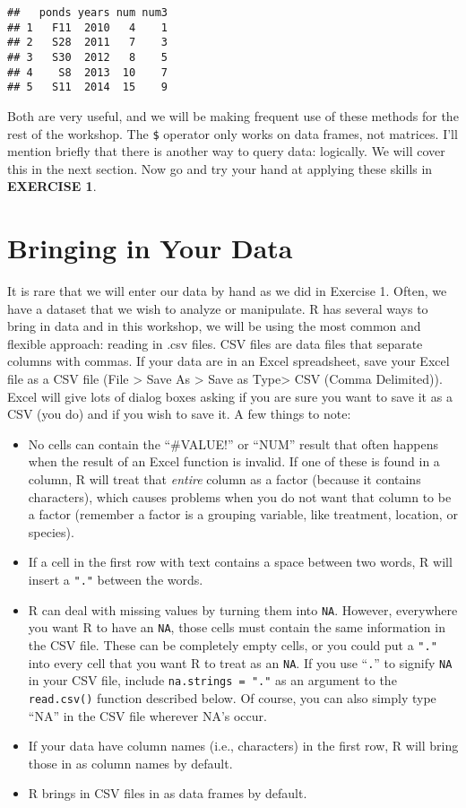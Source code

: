 \documentclass[]{book}
\theoremstyle{definition}
\theoremstyle{definition}
\theoremstyle{definition}
\theoremstyle{remark}
\begin{document}
\begin{verbatim}
##   ponds years num num3
## 1   F11  2010   4    1
## 2   S28  2011   7    3
## 3   S30  2012   8    5
## 4    S8  2013  10    7
## 5   S11  2014  15    9
\end{verbatim}

Both are very useful, and we will be making frequent use of these
methods for the rest of the workshop. The \texttt{\$} operator only
works on data frames, not matrices. I'll mention briefly that there is
another way to query data: logically. We will cover this in the next
section. Now go and try your hand at applying these skills in
\textbf{EXERCISE 1}.

\chapter{Bringing in Your Data}\label{bringing-in-your-data}

It is rare that we will enter our data by hand as we did in Exercise 1.
Often, we have a dataset that we wish to analyze or manipulate. R has
several ways to bring in data and in this workshop, we will be using the
most common and flexible approach: reading in .csv files. CSV files are
data files that separate columns with commas. If your data are in an
Excel spreadsheet, save your Excel file as a CSV file (File
\textgreater{} Save As \textgreater{} Save as Type\textgreater{} CSV
(Comma Delimited)). Excel will give lots of dialog boxes asking if you
are sure you want to save it as a CSV (you do) and if you wish to save
it. A few things to note:

\begin{itemize}
\item
  No cells can contain the ``\#VALUE!'' or ``NUM'' result that often
  happens when the result of an Excel function is invalid. If one of
  these is found in a column, R will treat that \emph{entire} column as
  a factor (because it contains characters), which causes problems when
  you do not want that column to be a factor (remember a factor is a
  grouping variable, like treatment, location, or species).
\item
  If a cell in the first row with text contains a space between two
  words, R will insert a \texttt{"."} between the words.
\item
  R can deal with missing values by turning them into \texttt{NA}.
  However, everywhere you want R to have an \texttt{NA}, those cells
  must contain the same information in the CSV file. These can be
  completely empty cells, or you could put a \texttt{"."} into every
  cell that you want R to treat as an \texttt{NA}. If you use
  ``\texttt{.}'' to signify \texttt{NA} in your CSV file, include
  \texttt{na.strings\ =\ "."} as an argument to the \texttt{read.csv()}
  function described below. Of course, you can also simply type ``NA''
  in the CSV file wherever NA's occur.
\item
  If your data have column names (i.e., characters) in the first row, R
  will bring those in as column names by default.
\item
  R brings in CSV files in as data frames by default.
\end{itemize}
\end{document}
